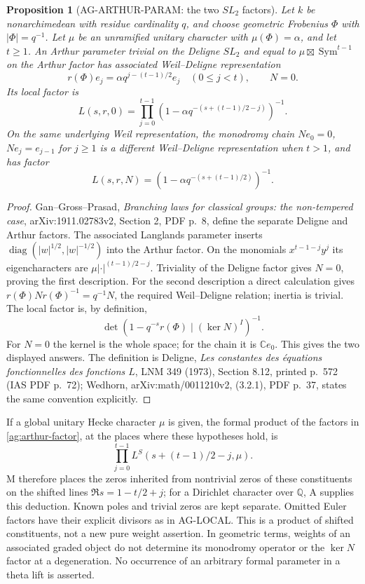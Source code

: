 \documentclass[11pt,a4paper]{article}
\newtheorem{proposition}{Proposition}
\begin{document}
\begin{proposition}[AG-ARTHUR-PARAM: the two $SL_2$ factors]
Let $k$ be nonarchimedean with residue cardinality $q$, and choose
geometric Frobenius $\Phi$ with $|\Phi|=q^{-1}$. Let $\mu$ be an
unramified unitary character with $\mu(\Phi)=\alpha$, and let
$t\ge1$. An Arthur parameter trivial on the Deligne $SL_2$
and equal to $\mu\boxtimes\operatorname{Sym}^{t-1}$ on the
Arthur factor has associated Weil--Deligne representation
\[
 r(\Phi)e_j=\alpha q^{j-(t-1)/2}e_j\quad(0\le j<t),
 \qquad N=0.
\]
Its local factor is
\begin{equation}\label{ag:arthur-factor}
 L(s,r,0)=\prod_{j=0}^{t-1}
       (1-\alpha q^{-(s+(t-1)/2-j)})^{-1}.
\end{equation}
On the same underlying Weil representation, the monodromy chain
$Ne_0=0$, $Ne_j=e_{j-1}$ for $j\ge1$ is a different
Weil--Deligne representation when $t>1$, and has factor
\[
 L(s,r,N)=(1-\alpha q^{-(s+(t-1)/2)})^{-1}.
\]
\end{proposition}
\begin{proof}
Gan--Gross--Prasad, \emph{Branching laws for classical groups:
the non-tempered case}, arXiv:1911.02783v2, Section 2,
PDF p.~8, define the separate Deligne and Arthur factors.
The associated Langlands parameter inserts
$\operatorname{diag}(|w|^{1/2},|w|^{-1/2})$ into the Arthur
factor. On the monomials $x^{t-1-j}y^j$ its eigencharacters
are $\mu|\cdot|^{(t-1)/2-j}$. Triviality of the Deligne
factor gives $N=0$, proving the first description.
For the second description a direct calculation gives
$r(\Phi)Nr(\Phi)^{-1}=q^{-1}N$, the required
Weil--Deligne relation; inertia is trivial.
The local factor is, by definition,
\[
 \det(1-q^{-s}r(\Phi)\mid(\ker N)^I)^{-1}.
\]
For $N=0$ the kernel is the whole space; for the chain it is
$\mathbb C e_0$. This gives the two displayed answers.
The definition is Deligne, \emph{Les constantes des équations
fonctionnelles des fonctions $L$}, LNM 349 (1973),
Section 8.12, printed p.~572 (IAS PDF p.~72);
Wedhorn, arXiv:math/0011210v2, (3.2.1), PDF p.~37,
states the same convention explicitly.
\end{proof}

If a global unitary Hecke character $\mu$ is given, the formal
product of the factors in \eqref{ag:arthur-factor}, at the places
where these hypotheses hold, is
\[
 \prod_{j=0}^{t-1}L^S(s+(t-1)/2-j,\mu).
\]
M therefore places the zeros inherited from nontrivial zeros of
these constituents on the shifted lines $\Re s=1-t/2+j$;
for a Dirichlet character over $\mathbb Q$, A supplies this
deduction. Known poles and trivial zeros are kept separate.
Omitted Euler factors have their explicit divisors as in AG-LOCAL.
This is a product of shifted constituents, not a new pure
weight assertion. In geometric terms, weights of an associated
graded object do not determine its monodromy operator or the
$\ker N$ factor at a degeneration. No occurrence of an arbitrary
formal parameter in a theta lift is asserted.
\end{document}
